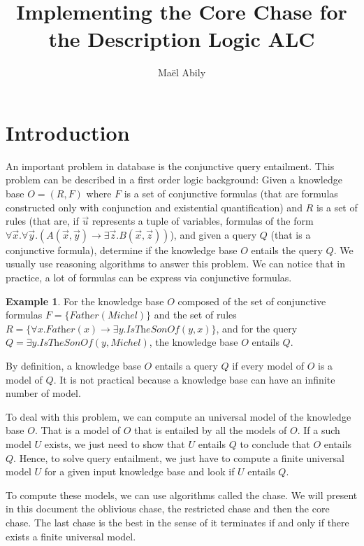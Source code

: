 \documentclass{article}
\title{Implementing the Core Chase for the Description Logic ALC}
\author{Maël Abily}
\theoremstyle{definition}
\newtheorem{example}{Example}[section]
\theoremstyle{remark}
\begin{document}
\maketitle						%



\section{Introduction}

An important problem in database is the conjunctive query entailment. This problem can be described in a first order logic background: Given a knowledge base $O = (R,F)$ where $F$ is a set of conjunctive formulas (that are formulas constructed only with conjunction and existential quantification) and $R$ is a set of  rules (that are, if $\vec u$ represents a tuple of variables, formulas of the form $\forall \vec x.\forall \vec y.( A(\vec x,\vec y) \rightarrow \exists \vec z. B(\vec x,\vec z))$), and given a query $Q$ (that is a conjunctive formula), determine if the knowledge base $O$ entails the query $Q$. We usually use reasoning algorithms to answer this problem. We can notice that in practice, a lot of formulas can be express via conjunctive formulas.

\begin{example}
For the knowledge base $O$ composed of the set of conjunctive formulas $F = \{\textit{Father}(\textit{Michel}) \}$ and the set of rules $R= \{\forall x. \textit{Father}(x) \rightarrow \exists y. \textit{IsTheSonOf}(y,x) \}$, and for the query $Q = \exists y. \textit{IsTheSonOf}(y,Michel)$, the knowledge base $O$ entails $Q$.
\end{example}

By definition, a knowledge base $O$ entails a query $Q$ if every  model of $O$ is a model of $Q$. It is not practical because a knowledge base can have an infinite number of model.

To deal with this problem, we can compute an universal model of the knowledge base $O$. That is a model of $O$ that is entailed by all the models of $O$. If a such model $U$ exists, we just need to show that $U$ entails $Q$ to conclude that $O$ entails $Q$. Hence, to solve query entailment, we just have to compute a finite universal model $U$ for a given input knowledge base and look if $U$ entails $Q$.

To compute these models, we can use algorithms called the chase. We will present in this document the oblivious chase, the restricted chase and then the core chase. The last chase is the best in the sense of it terminates if and only if there exists a finite universal model. 
\end{document}
